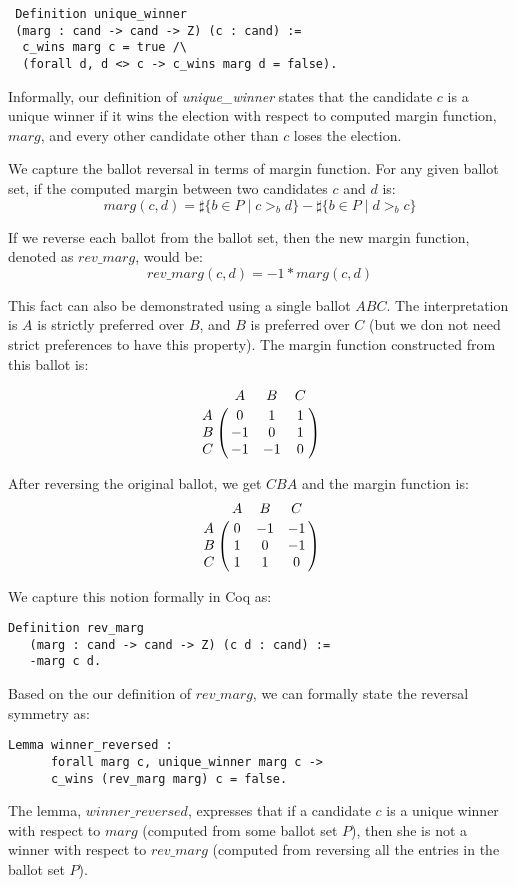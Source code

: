  \begin{verbatim}
 Definition unique_winner 
 (marg : cand -> cand -> Z) (c : cand) :=
  c_wins marg c = true /\
  (forall d, d <> c -> c_wins marg d = false).
\end{verbatim}  

Informally, our definition of \textit{unique\_winner} states that the candidate $c$ is a unique winner
if it wins the election with respect to computed margin function, $marg$, and every other candidate 
other than $c$ loses the election. 

We capture the ballot reversal in terms of margin function. For any given ballot set, if the computed 
margin between two candidates $c$ and $d$ is: 
\[
  marg(c, d) = \sharp \lbrace b \in P \mid c >_b d \rbrace -
            \sharp \lbrace b \in P \mid d >_b c \rbrace
\] 

If we reverse each ballot from the ballot set, then the new margin function, denoted as $rev\_marg$, would be:
\[
  rev\_marg(c, d) = -1 * marg (c, d)
\] 

This fact can also be demonstrated using a single ballot $ABC$. The interpretation is $A$ is strictly preferred over $B$, 
and $B$ is preferred over $C$ (but we don not need strict preferences to have this property). 
The margin function constructed from this ballot is: 

\[
\bordermatrix{ & A & B & C \cr
      A & 0 & 1 & 1 \cr
      B & -1 & 0 & 1 \cr
      C & -1 & -1 & 0 }
      \]
      
After reversing the original ballot, we get $CBA$ and the margin function is:
\[
\bordermatrix{ & A & B & C \cr
      A & 0 & -1 & -1 \cr
      B & 1 & 0 & -1 \cr
      C & 1 & 1 & 0 }
      \]

We capture this notion formally in Coq as:

\begin{verbatim}
Definition rev_marg 
   (marg : cand -> cand -> Z) (c d : cand) :=
   -marg c d.
\end{verbatim}

Based on the our definition of $rev\_marg$, we can formally state the reversal symmetry as:
\begin{verbatim}
Lemma winner_reversed :
      forall marg c, unique_winner marg c ->
      c_wins (rev_marg marg) c = false.
\end{verbatim}

The lemma, $winner\_reversed$, expresses that if a candidate $c$ is a unique winner 
with respect to $marg$ (computed from some ballot set $P$), then she is not a winner with respect 
to $rev\_marg$ (computed from reversing all the entries in the ballot set $P$).


